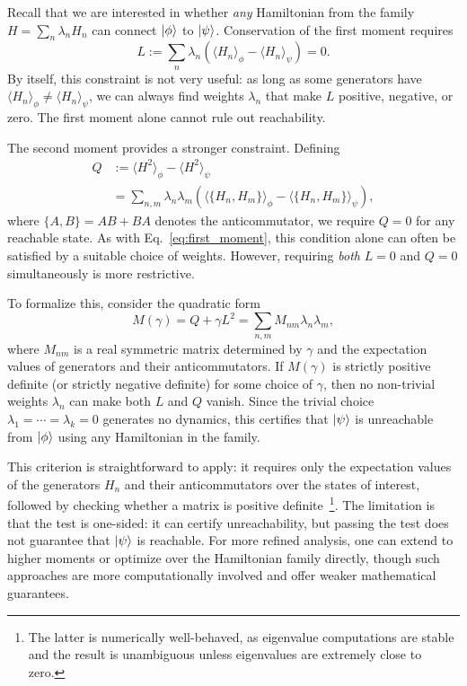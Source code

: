 \documentclass[aps,prx,reprint,superscriptaddress,footnote, twocolumn,notitlepage]{revtex4-2}
\begin{document}
Recall that we are interested in whether \emph{any} Hamiltonian from the family $H = \sum_n \lambda_n H_n$ can connect $\ket{\phi}$ to $\ket{\psi}$. Conservation of the first moment requires
\begin{equation}
    L := \sum_n \lambda_n \left( \langle H_n \rangle_\phi - \langle H_n \rangle_\psi \right) = 0.
    \label{eq:first_moment}
\end{equation}
By itself, this constraint is not very useful: as long as some generators have $\langle H_n \rangle_\phi \neq \langle H_n \rangle_\psi$, we can always find weights $\lambda_n$ that make $L$ positive, negative, or zero. The first moment alone cannot rule out reachability.

The second moment provides a stronger constraint. Defining
\begin{equation}\begin{aligned}
    Q &:= \langle H^2 \rangle_\phi - \langle H^2 \rangle_\psi \\
    &= \sum_{n,m} \lambda_n \lambda_m \left( \langle \{H_n, H_m\} \rangle_\phi - \langle \{H_n, H_m\} \rangle_\psi \right),
    \end{aligned}
\end{equation}
where $\{A, B\} = AB + BA$ denotes the anticommutator, we require $Q = 0$ for any reachable state. As with Eq.~\eqref{eq:first_moment}, this condition alone can often be satisfied by a suitable choice of weights. However, requiring \emph{both} $L = 0$ and $Q = 0$ simultaneously is more restrictive.

To formalize this, consider the quadratic form
\begin{equation}
    M(\gamma) = Q + \gamma L^2 = \sum_{n,m} M_{nm} \lambda_n \lambda_m,
\end{equation}
where $M_{nm}$ is a real symmetric matrix determined by $\gamma$ and the expectation values of generators and their anticommutators. If $M(\gamma)$ is strictly positive definite (or strictly negative definite) for some choice of $\gamma$, then no non-trivial weights $\lambda_n$ can make both $L$ and $Q$ vanish. Since the trivial choice $\lambda_1 = \cdots = \lambda_k = 0$ generates no dynamics, this certifies that $\ket{\psi}$ is unreachable from $\ket{\phi}$ using any Hamiltonian in the family.

This criterion is straightforward to apply: it requires only the expectation values of the generators $H_n$ and their anticommutators over the states of interest, followed by checking whether a matrix is positive definite~\footnote{The latter is numerically well-behaved, as eigenvalue computations are stable and the result is unambiguous unless eigenvalues are extremely close to zero.}. The limitation is that the test is one-sided: it can certify unreachability, but passing the test does not guarantee that $\ket{\psi}$ is reachable. For more refined analysis, one can extend to higher moments or optimize over the Hamiltonian family directly, though such approaches are more computationally involved and offer weaker mathematical guarantees.
\end{document}
